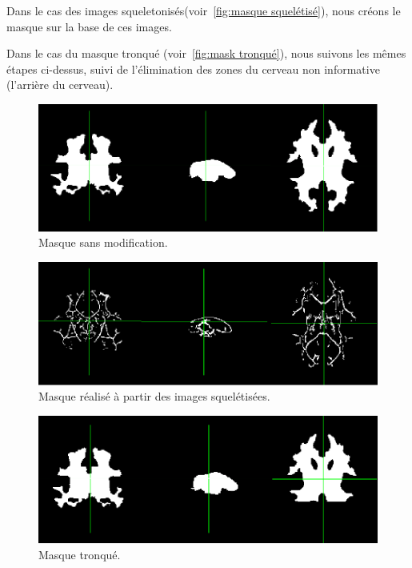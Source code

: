 Dans le cas des images squeletonisés(voir~\autoref{fig:masque squelétisé}), nous créons le masque sur la base de ces images. 

Dans le cas du masque tronqué (voir~\autoref{fig:mask tronqué}), nous suivons les mêmes étapes ci-dessus, suivi de l'élimination des zones du cerveau non informative (l'arrière du cerveau).



\begin{figure}[h]
	\centering
	\includegraphics[scale = 0.5]{images/mask}
	\caption{Masque sans modification.}
	\label{fig:masque}
\end{figure}

\begin{figure}[h]
	\centering
	\includegraphics[scale = 0.5]{images/mask_skel}
	\caption{Masque réalisé à partir des images squelétisées.}
	\label{fig:masque squelétisé}
\end{figure}
  	
\begin{figure}[t]
	\centering
	\includegraphics[scale = 0.5]{images/mask_trunk}
	\caption{Masque tronqué.}
	\label{fig:mask tronqué}
\end{figure}


